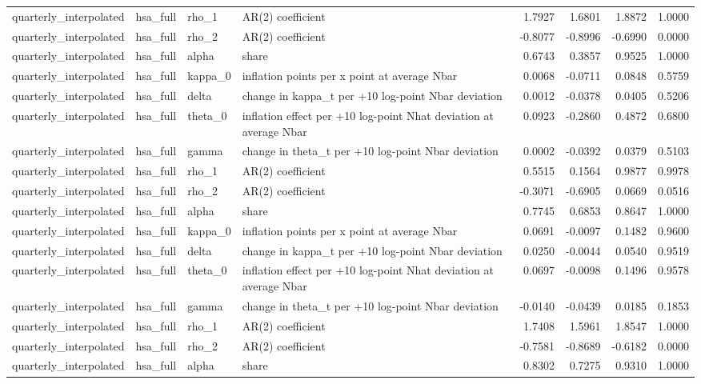 \begin{tabular}{llllrrrr}
quarterly\_interpolated & hsa\_full & rho\_1 & AR(2) coefficient & 1.7927 & 1.6801 & 1.8872 & 1.0000 \\
quarterly\_interpolated & hsa\_full & rho\_2 & AR(2) coefficient & -0.8077 & -0.8996 & -0.6990 & 0.0000 \\
quarterly\_interpolated & hsa\_full & alpha & share & 0.6743 & 0.3857 & 0.9525 & 1.0000 \\
quarterly\_interpolated & hsa\_full & kappa\_0 & inflation points per x point at average Nbar & 0.0068 & -0.0711 & 0.0848 & 0.5759 \\
quarterly\_interpolated & hsa\_full & delta & change in kappa\_t per +10 log-point Nbar deviation & 0.0012 & -0.0378 & 0.0405 & 0.5206 \\
quarterly\_interpolated & hsa\_full & theta\_0 & inflation effect per +10 log-point Nhat deviation at average Nbar & 0.0923 & -0.2860 & 0.4872 & 0.6800 \\
quarterly\_interpolated & hsa\_full & gamma & change in theta\_t per +10 log-point Nbar deviation & 0.0002 & -0.0392 & 0.0379 & 0.5103 \\
quarterly\_interpolated & hsa\_full & rho\_1 & AR(2) coefficient & 0.5515 & 0.1564 & 0.9877 & 0.9978 \\
quarterly\_interpolated & hsa\_full & rho\_2 & AR(2) coefficient & -0.3071 & -0.6905 & 0.0669 & 0.0516 \\
quarterly\_interpolated & hsa\_full & alpha & share & 0.7745 & 0.6853 & 0.8647 & 1.0000 \\
quarterly\_interpolated & hsa\_full & kappa\_0 & inflation points per x point at average Nbar & 0.0691 & -0.0097 & 0.1482 & 0.9600 \\
quarterly\_interpolated & hsa\_full & delta & change in kappa\_t per +10 log-point Nbar deviation & 0.0250 & -0.0044 & 0.0540 & 0.9519 \\
quarterly\_interpolated & hsa\_full & theta\_0 & inflation effect per +10 log-point Nhat deviation at average Nbar & 0.0697 & -0.0098 & 0.1496 & 0.9578 \\
quarterly\_interpolated & hsa\_full & gamma & change in theta\_t per +10 log-point Nbar deviation & -0.0140 & -0.0439 & 0.0185 & 0.1853 \\
quarterly\_interpolated & hsa\_full & rho\_1 & AR(2) coefficient & 1.7408 & 1.5961 & 1.8547 & 1.0000 \\
quarterly\_interpolated & hsa\_full & rho\_2 & AR(2) coefficient & -0.7581 & -0.8689 & -0.6182 & 0.0000 \\
quarterly\_interpolated & hsa\_full & alpha & share & 0.8302 & 0.7275 & 0.9310 & 1.0000 \\

\end{tabular}
